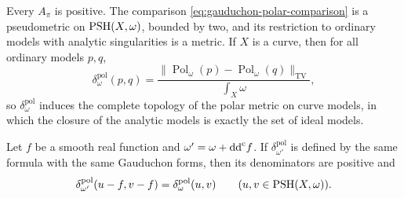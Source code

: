 \begin{proposition}\label{prop:gauduchon-polar-comparison}
Every $A_\pi$ is positive. The comparison \eqref{eq:gauduchon-polar-comparison} is a pseudometric on $\mathrm{PSH}(X,\omega)$, bounded by two, and its restriction to ordinary models with analytic singularities is a metric. If $X$ is a curve, then for all ordinary models $p,q$,
\[
 \delta_\omega^{\mathrm{pol}}(p,q)
       =\frac{\|\operatorname{Pol}_\omega(p)-\operatorname{Pol}_\omega(q)\|_{\mathrm{TV}}}{\int_X\omega},
\]
so $\delta_\omega^{\mathrm{pol}}$ induces the complete topology of the polar metric on curve models, in which the closure of the analytic models is exactly the set of ideal models.

Let $f$ be a smooth real function and $\omega'=\omega+\mathrm{dd}^{\mathrm{c}} f$. If $\delta_{\omega'}^{\mathrm{pol}}$ is defined by the same formula with the same Gauduchon forms, then its denominators are positive and
\[
 \delta_{\omega'}^{\mathrm{pol}}(u-f,v-f)
       =\delta_\omega^{\mathrm{pol}}(u,v)
       \qquad(u,v\in\mathrm{PSH}(X,\omega)).
\]
\end{proposition}
